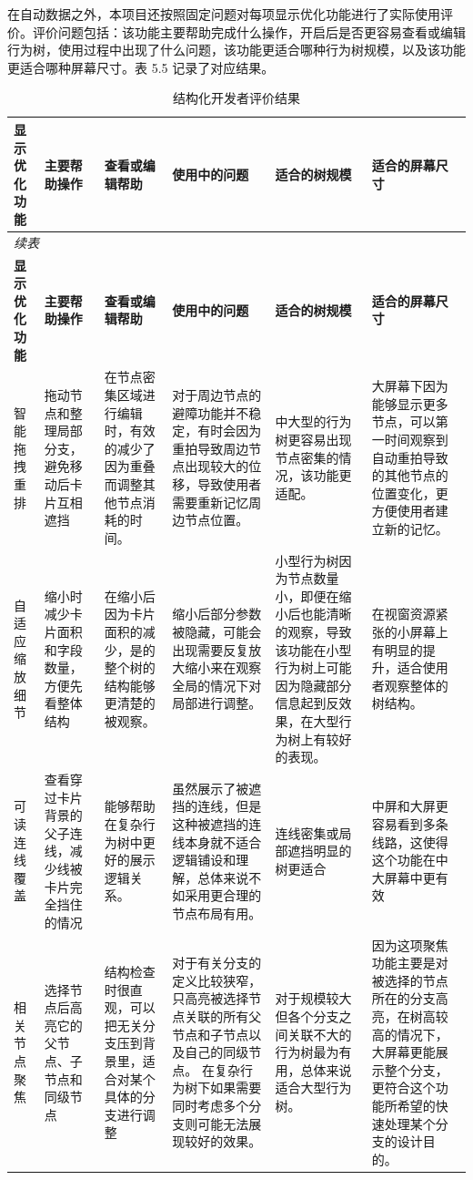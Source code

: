 \documentclass[11pt,a4paper,oneside,extrafontsizes]{memoir}
\begin{document}
在自动数据之外，本项目还按照固定问题对每项显示优化功能进行了实际使用评价。评价问题包括：该功能主要帮助完成什么操作，开启后是否更容易查看或编辑行为树，使用过程中出现了什么问题，该功能更适合哪种行为树规模，以及该功能更适合哪种屏幕尺寸。表 5.5 记录了对应结果。

\begin{center}

\begin{longtable}{@{}p{} p{} p{} p{} p{} p{}@{}}
\caption{结构化开发者评价结果}\label{tab:developer-evaluation}\\
\toprule
\textbf{显示优化功能} & \textbf{主要帮助操作} & \textbf{查看或编辑帮助} & \textbf{使用中的问题} & \textbf{适合的树规模} & \textbf{适合的屏幕尺寸} \\
\midrule
\endfirsthead
\multicolumn{6}{l}{\itshape 续表}\\
\toprule
\textbf{显示优化功能} & \textbf{主要帮助操作} & \textbf{查看或编辑帮助} & \textbf{使用中的问题} & \textbf{适合的树规模} & \textbf{适合的屏幕尺寸} \\
\midrule
\endhead
智能拖拽重排 & 拖动节点和整理局部分支，避免移动后卡片互相遮挡 & 在节点密集区域进行编辑时，有效的减少了因为重叠而调整其他节点消耗的时间。 & 对于周边节点的避障功能并不稳定，有时会因为重拍导致周边节点出现较大的位移，导致使用者需要重新记忆周边节点位置。 & 中大型的行为树更容易出现节点密集的情况，该功能更适配。 & 大屏幕下因为能够显示更多节点，可以第一时间观察到自动重拍导致的其他节点的位置变化，更方便使用者建立新的记忆。 \\
自适应缩放细节 & 缩小时减少卡片面积和字段数量，方便先看整体结构 & 在缩小后因为卡片面积的减少，是的整个树的结构能够更清楚的被观察。 & 缩小后部分参数被隐藏，可能会出现需要反复放大缩小来在观察全局的情况下对局部进行调整。 & 小型行为树因为节点数量小，即便在缩小后也能清晰的观察，导致该功能在小型行为树上可能因为隐藏部分信息起到反效果，在大型行为树上有较好的表现。 & 在视窗资源紧张的小屏幕上有明显的提升，适合使用者观察整体的树结构。 \\
可读连线覆盖 & 查看穿过卡片背景的父子连线，减少线被卡片完全挡住的情况 & 能够帮助在复杂行为树中更好的展示逻辑关系。 & 虽然展示了被遮挡的连线，但是这种被遮挡的连线本身就不适合逻辑铺设和理解，总体来说不如采用更合理的节点布局有用。 & 连线密集或局部遮挡明显的树更适合 & 中屏和大屏更容易看到多条线路，这使得这个功能在中大屏幕中更有效 \\
相关节点聚焦 & 选择节点后高亮它的父节点、子节点和同级节点 & 结构检查时很直观，可以把无关分支压到背景里，适合对某个具体的分支进行调整 & 对于有关分支的定义比较狭窄，只高亮被选择节点关联的所有父节点和子节点以及自己的同级节点。 在复杂行为树下如果需要同时考虑多个分支则可能无法展现较好的效果。 & 对于规模较大但各个分支之间关联不大的行为树最为有用，总体来说适合大型行为树。 & 因为这项聚焦功能主要是对被选择的节点所在的分支高亮，在树高较高的情况下，大屏幕更能展示整个分支，更符合这个功能所希望的快速处理某个分支的设计目的。 \\

\end{longtable}
\end{center}
\end{document}
